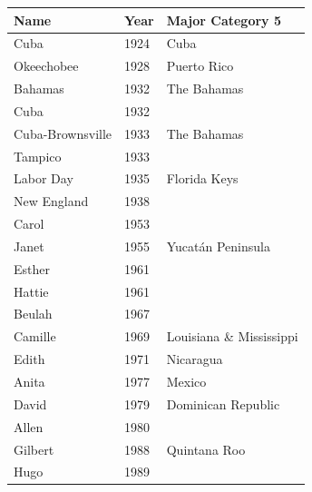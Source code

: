 \documentclass{article}
\begin{document}
\begin{tabular}{lll}
\toprule
Name & Year & Major Category 5 \\
\midrule
Cuba & 1924 & Cuba \\
Okeechobee & 1928 & Puerto Rico \\
Bahamas & 1932 & The Bahamas \\
Cuba & 1932 &  \\
Cuba-Brownsville & 1933 & The Bahamas \\
Tampico & 1933 &  \\
Labor Day & 1935 & Florida Keys \\
New England & 1938 &  \\
Carol & 1953 &  \\
Janet & 1955 & Yucatán Peninsula \\
Esther & 1961 &  \\
Hattie & 1961 &  \\
Beulah & 1967 &  \\
Camille & 1969 & Louisiana \& Mississippi \\
Edith & 1971 & Nicaragua \\
Anita & 1977 & Mexico \\
David & 1979 & Dominican Republic \\
Allen & 1980 &  \\
Gilbert & 1988 & Quintana Roo \\
Hugo & 1989 &  \\
\bottomrule
\end{tabular}
\end{document}
